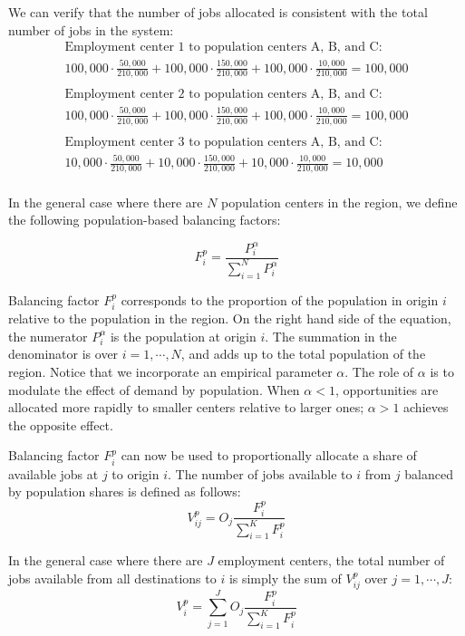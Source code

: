 \documentclass[]{elsarticle} %
\begin{document}
We can verify that the number of jobs allocated is consistent with the
total number of jobs in the system: \[
\begin{array}{l}
\text{Employment center 1 to population centers A, B, and C: }\\
100,000 \cdot \frac{50,000}{210,000} + 100,000 \cdot \frac{150,000}{210,000} + 100,000 \cdot \frac{10,000}{210,000} = 100,000\\
\\
\text{Employment center 2 to population centers A, B, and C: }\\
100,000 \cdot \frac{50,000}{210,000} + 100,000 \cdot \frac{150,000}{210,000} + 100,000 \cdot \frac{10,000}{210,000} = 100,000\\
\\
\text{Employment center 3 to population centers A, B, and C: }\\
10,000 \cdot \frac{50,000}{210,000} + 10,000 \cdot \frac{150,000}{210,000} + 10,000 \cdot \frac{10,000}{210,000} = 10,000\\
\end{array}
\]

In the general case where there are \(N\) population centers in the
region, we define the following population-based balancing factors:

\begin{equation}
\label{eq:population-balancing-factor}
F^p_{i} = \frac{P_{i}^\alpha}{\sum_{i=1}^N P_{i}^\alpha}
\end{equation}

Balancing factor \(F^p_{i}\) corresponds to the proportion of the
population in origin \(i\) relative to the population in the region. On
the right hand side of the equation, the numerator \(P_{i}^\alpha\) is
the population at origin \(i\). The summation in the denominator is over
\(i=1,\cdots,N\), and adds up to the total population of the region.
Notice that we incorporate an empirical parameter \(\alpha\). The role
of \(\alpha\) is to modulate the effect of demand by population. When
\(\alpha <1\), opportunities are allocated more rapidly to smaller
centers relative to larger ones; \(\alpha>1\) achieves the opposite
effect.

Balancing factor \(F^p_{i}\) can now be used to proportionally allocate
a share of available jobs at \(j\) to origin \(i\). The number of jobs
available to \(i\) from \(j\) balanced by population shares is defined
as follows: \[
V^p_{ij} = O_j\frac{F^p_{i}}{\sum_{i=1}^K F^p_{i}}
\]

In the general case where there are \(J\) employment centers, the total
number of jobs available from all destinations to \(i\) is simply the
sum of \(V^p_{ij}\) over \(j=1,\cdots, J\): \[
V^p_{i} = \sum_{j=1}^J O_j\frac{F^p_{i}}{\sum_{i=1}^K F^p_{i}}
\]
\end{document}
